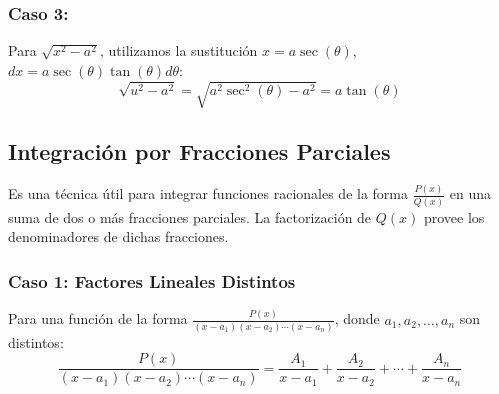 \begin{center}
\end{center}

\subsubsection{Caso 3:}

Para \(\sqrt{x^2 - a^2}\), utilizamos la sustitución \(x = a \sec(\theta)\), \(dx = a \sec(\theta) \tan(\theta) d\theta\):
\begin{equation}
    \sqrt{u^2 - a^2} = \sqrt{a^2 \sec^2(\theta) - a^2} = a \tan(\theta)
\end{equation}

\begin{center}
\end{center}

\newpage

\subsection{Integración por Fracciones Parciales}
Es una técnica útil para integrar funciones racionales  de la forma $\frac{P(x)}{Q(x)}$ en una suma de dos o más fracciones parciales. La factorización de $Q(x)$ provee los denominadores de dichas fracciones.

\subsubsection{Caso 1: Factores Lineales Distintos}
Para una función de la forma \(\frac{P(x)}{(x-a_1)(x-a_2)\cdots(x-a_n)}\), donde \(a_1, a_2, \ldots, a_n\) son distintos:
\begin{equation}
    \frac{P(x)}{(x-a_1)(x-a_2)\cdots(x-a_n)} = \frac{A_1}{x-a_1} + \frac{A_2}{x-a_2} + \cdots + \frac{A_n}{x-a_n}
\end{equation}


